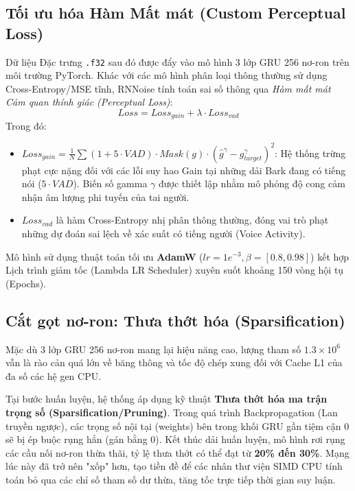 \subsection{Tối ưu hóa Hàm Mất mát (Custom Perceptual Loss)}
Dữ liệu Đặc trưng \texttt{.f32} sau đó được đẩy vào mô hình 3 lớp GRU 256 nơ-ron trên môi trường PyTorch. Khác với các mô hình phân loại thông thường sử dụng Cross-Entropy/MSE tĩnh, RNNoise tính toán sai số thông qua \textit{Hàm mất mát Cảm quan thính giác (Perceptual Loss)}:
\begin{equation}
    Loss = Loss_{gain} + \lambda \cdot Loss_{vad}
\end{equation}
Trong đó:
\begin{itemize}
    \item $Loss_{gain} = \frac{1}{N} \sum (1 + 5 \cdot VAD) \cdot Mask(g) \cdot \left( \hat{g}^\gamma - g_{target}^\gamma \right)^2$: Hệ thống trừng phạt cực nặng đối với các lỗi suy hao Gain tại những dải Bark đang có tiếng nói ($5 \cdot VAD$). Biến số gamma $\gamma$ được thiết lập nhằm mô phỏng độ cong cảm nhận âm lượng phi tuyến của tai người.
    \item $Loss_{vad}$ là hàm Cross-Entropy nhị phân thông thường, đóng vai trò phạt những dự đoán sai lệch về xác suất có tiếng người (Voice Activity).
\end{itemize}
Mô hình sử dụng thuật toán tối ưu \textbf{AdamW} ($lr=1e^{-3}, \beta=[0.8, 0.98]$) kết hợp Lịch trình giảm tốc (Lambda LR Scheduler) xuyên suốt khoảng 150 vòng hội tụ (Epochs).

\subsection{Cắt gọt nơ-ron: Thưa thớt hóa (Sparsification)}
Mặc dù 3 lớp GRU 256 nơ-ron mang lại hiệu năng cao, lượng tham số $1.3 \times 10^6$ vẫn là rào cản quá lớn về băng thông và tốc độ chép xung đối với Cache L1 của đa số các hệ gen CPU. 

Tại bước huấn luyện, hệ thống áp dụng kỹ thuật \textbf{Thưa thớt hóa ma trận trọng số (Sparsification/Pruning)}. Trong quá trình Backpropagation (Lan truyền ngược), các trọng số nội tại (weights) bên trong khối GRU gần tiệm cận 0 sẽ bị ép buộc rụng hẳn (gán bằng 0). Kết thúc dải huấn luyện, mô hình rơi rụng các cầu nối nơ-ron thừa thãi, tỷ lệ thưa thớt có thể đạt từ \textbf{20\% đến 30\%}. Mạng lúc này đã trở nên "xốp" hơn, tạo tiền đề để các nhân thư viện SIMD CPU tính toán bỏ qua các chỉ số tham số dư thừa, tăng tốc trực tiếp thời gian suy luận.

